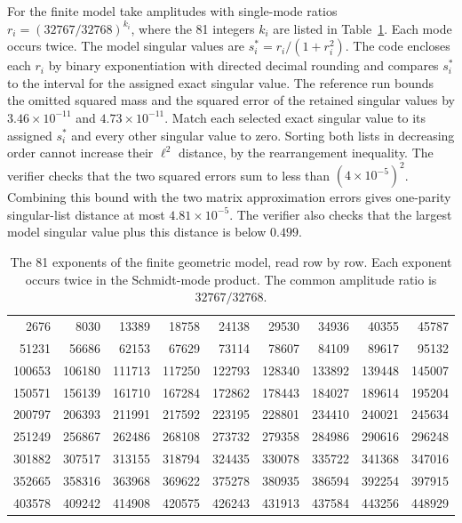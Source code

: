 For the finite model take amplitudes with single-mode ratios
$r_i=(32767/32768)^{k_i}$, where the 81 integers $k_i$ are listed in Table~\ref{tab:xx84-model}. Each mode occurs twice. The model
singular values are $s_i^*=r_i/(1+r_i^2)$. The code encloses each
$r_i$ by binary exponentiation with directed decimal rounding and
compares $s_i^*$ to the interval for the assigned exact singular value.
The reference run bounds the omitted squared mass and the squared error
of the retained singular values by $3.46\times10^{-11}$ and
$4.73\times10^{-11}$. Match each selected exact singular value to its
assigned $s_i^*$ and every other singular value to zero. Sorting both
lists in decreasing order cannot increase their $\ell^2$ distance,
by the rearrangement inequality. The verifier checks that the two squared
errors sum to less than $(4\times10^{-5})^2$. Combining this bound with
the two matrix approximation errors gives one-parity singular-list
distance at most $4.81\times10^{-5}$. The verifier also checks that the
largest model singular value plus this distance is below $0.499$.


\begin{table}[htb]
\centering\footnotesize
\begin{tabular}{@{}rrrrrrrrr@{}}
\toprule
2676 & 8030 & 13389 & 18758 & 24138 & 29530 & 34936 & 40355 & 45787 \\
51231 & 56686 & 62153 & 67629 & 73114 & 78607 & 84109 & 89617 & 95132 \\
100653 & 106180 & 111713 & 117250 & 122793 & 128340 & 133892 & 139448 & 145007 \\
150571 & 156139 & 161710 & 167284 & 172862 & 178443 & 184027 & 189614 & 195204 \\
200797 & 206393 & 211991 & 217592 & 223195 & 228801 & 234410 & 240021 & 245634 \\
251249 & 256867 & 262486 & 268108 & 273732 & 279358 & 284986 & 290616 & 296248 \\
301882 & 307517 & 313155 & 318794 & 324435 & 330078 & 335722 & 341368 & 347016 \\
352665 & 358316 & 363968 & 369622 & 375278 & 380935 & 386594 & 392254 & 397915 \\
403578 & 409242 & 414908 & 420575 & 426243 & 431913 & 437584 & 443256 & 448929 \\
\bottomrule
\end{tabular}
\caption{The 81 exponents of the finite geometric model, read row by row.
Each exponent occurs twice in the Schmidt-mode product. The common
amplitude ratio is $32767/32768$.}\label{tab:xx84-model}
\end{table}

